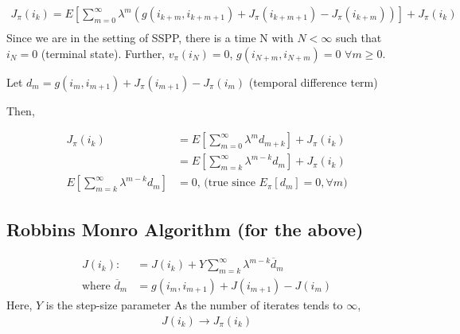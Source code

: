 \documentclass[11pt]{article}
\begin{document}
\begin{align*}
 J_{\pi}(i_k) = E \left[ \sum^{\infty}_{m=0} \lambda^m \left( g(i_{k+m}, i_{k+m+1}) + J_{\pi}(i_{k+m+1}) - J_{\pi}(i_{k+m}) \right) \right] + J_{\pi}(i_k) \\
\end{align*}
Since we are in the setting of SSPP, there is a time N with \(N < \infty\) such that \(i_N = 0\) (terminal state).
Further, \(v_{\pi}(i_N) = 0\), \(g(i_{N+m}, i_{N+m}) = 0\) \(\forall m \ge 0\).

Let \(d_m = g(i_m, i_{m+1}) + J_{\pi}(i_{m+1}) - J_{\pi}(i_m)\) (temporal difference term)

Then,

\begin{align*}
  J_{\pi}(i_k) &= E \left[ \sum_{m=0}^{\infty} \lambda^m d_{m+k} \right] + J_{\pi}(i_k) \\
               &= E \left[ \sum_{m=k}^{\infty} \lambda^{m-k} d_m \right] + J_{\pi}(i_k) \\
E \left[ \sum_{m=k}^{\infty} \lambda^{m-k} d_m \right] &= 0 \text{, (true since $E_{\pi}[d_m] = 0, \forall m$)}
\end{align*}

\subsection{Robbins Monro Algorithm (for the above)}
\label{sec:orgddbace0}

\begin{align*}
  J(i_k) :&= J(i_k) + Y \sum_{m=k}^{\infty} \lambda^{m-k}\overline{d}_m \\
\text{where } \overline{d}_m &= g(i_m, i_{m+1}) + J(i_{m+1}) - J(i_m)
\end{align*}
Here, \(Y\) is the step-size parameter
As the number of iterates tends to \(\infty\),
\begin{align*}
  J(i_k) \rightarrow J_{\pi}(i_k)
\end{align*}
\end{document}
